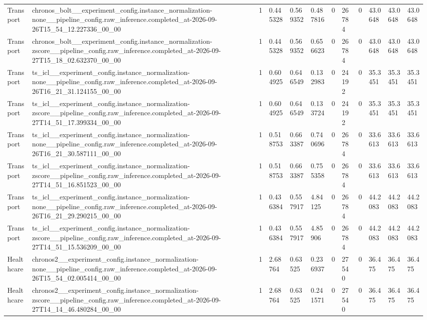 \begin{tabular}{llllllllllll}
Transport & chronos\_bolt\_\_experiment\_config.instance\_normalization-none\_\_pipeline\_config.raw\_inference.completed\_at-2026-09-26T15\_54\_12.227336\_00\_00 & 1 & 0.445328 & 0.569352 & 0.487816 & 0 & 26784 & 0 & 43.0648 & 43.0648 & 43.0648 \\
Transport & chronos\_bolt\_\_experiment\_config.instance\_normalization-zscore\_\_pipeline\_config.raw\_inference.completed\_at-2026-09-27T15\_18\_02.632370\_00\_00 & 1 & 0.445328 & 0.569352 & 0.656623 & 0 & 26784 & 0 & 43.0648 & 43.0648 & 43.0648 \\
Transport & ts\_icl\_\_experiment\_config.instance\_normalization-none\_\_pipeline\_config.raw\_inference.completed\_at-2026-09-26T16\_21\_31.124155\_00\_00 & 1 & 0.604925 & 0.646549 & 0.132983 & 0 & 24192 & 0 & 35.3451 & 35.3451 & 35.3451 \\
Transport & ts\_icl\_\_experiment\_config.instance\_normalization-zscore\_\_pipeline\_config.raw\_inference.completed\_at-2026-09-27T14\_51\_17.399334\_00\_00 & 1 & 0.604925 & 0.646549 & 0.133724 & 0 & 24192 & 0 & 35.3451 & 35.3451 & 35.3451 \\
Transport & ts\_icl\_\_experiment\_config.instance\_normalization-none\_\_pipeline\_config.raw\_inference.completed\_at-2026-09-26T16\_21\_30.587111\_00\_00 & 1 & 0.518753 & 0.663387 & 0.740696 & 0 & 26784 & 0 & 33.6613 & 33.6613 & 33.6613 \\
Transport & ts\_icl\_\_experiment\_config.instance\_normalization-zscore\_\_pipeline\_config.raw\_inference.completed\_at-2026-09-27T14\_51\_16.851523\_00\_00 & 1 & 0.518753 & 0.663387 & 0.755358 & 0 & 26784 & 0 & 33.6613 & 33.6613 & 33.6613 \\
Transport & ts\_icl\_\_experiment\_config.instance\_normalization-none\_\_pipeline\_config.raw\_inference.completed\_at-2026-09-26T16\_21\_29.290215\_00\_00 & 1 & 0.436384 & 0.557917 & 4.84125 & 0 & 26784 & 0 & 44.2083 & 44.2083 & 44.2083 \\
Transport & ts\_icl\_\_experiment\_config.instance\_normalization-zscore\_\_pipeline\_config.raw\_inference.completed\_at-2026-09-27T14\_51\_15.536209\_00\_00 & 1 & 0.436384 & 0.557917 & 4.85906 & 0 & 26784 & 0 & 44.2083 & 44.2083 & 44.2083 \\
Healthcare & chronos2\_\_experiment\_config.instance\_normalization-none\_\_pipeline\_config.raw\_inference.completed\_at-2026-09-26T15\_54\_02.005414\_00\_00 & 1 & 2.68764 & 0.63525 & 0.236937 & 0 & 27540 & 0 & 36.475 & 36.475 & 36.475 \\
Healthcare & chronos2\_\_experiment\_config.instance\_normalization-zscore\_\_pipeline\_config.raw\_inference.completed\_at-2026-09-27T14\_14\_46.480284\_00\_00 & 1 & 2.68764 & 0.63525 & 0.241571 & 0 & 27540 & 0 & 36.475 & 36.475 & 36.475 \\

\end{tabular}
